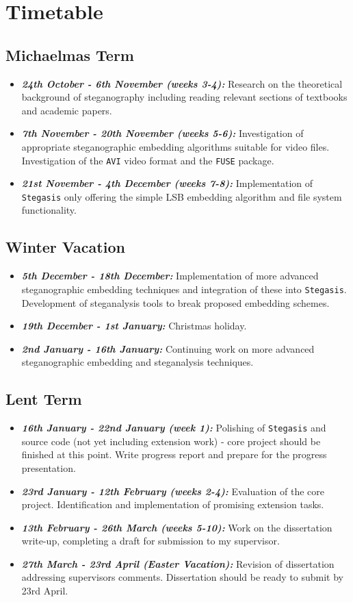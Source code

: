 \documentclass[paper=a4, fontsize=11pt,twoside]{scrartcl}    %
\numberwithin{table}{section}
\numberwithin{figure}{section}
\numberwithin{algorithm}{section}
\begin{document}
\section*{Timetable}
\subsection*{Michaelmas Term}
\begin{itemize}
\item \textbf{\textit{24th October - 6th November (weeks 3-4):}} Research on the theoretical background of steganography including reading relevant sections of textbooks and academic papers.
\item \textbf{\textit{7th November - 20th November (weeks 5-6):}} Investigation of appropriate steganographic embedding algorithms suitable for video files. Investigation of the \texttt{AVI} video format and the \texttt{FUSE} package.
\item \textbf{\textit{21st November - 4th December (weeks 7-8):}} Implementation of \texttt{Stegasis} only offering the simple LSB embedding algorithm and file system functionality.
\end{itemize}

\subsection*{Winter Vacation}
\begin{itemize}
\item \textbf{\textit{5th December - 18th December:}} Implementation of more advanced steganographic embedding techniques and integration of these into \texttt{Stegasis}. Development of steganalysis tools to break proposed embedding schemes.
\item \textbf{\textit{19th December - 1st January:}} Christmas holiday.
\item \textbf{\textit{2nd January - 16th January:}} Continuing work on more advanced steganographic embedding and steganalysis techniques.
\end{itemize}

\subsection*{Lent Term}
\begin{itemize}
\item \textbf{\textit{16th January - 22nd January (week 1):}} Polishing of \texttt{Stegasis} and source code (not yet including extension work) - core project should be finished at this point. Write progress report and prepare for the progress presentation.
\item \textbf{\textit{23rd January - 12th February (weeks 2-4):}} Evaluation of the core project. Identification and implementation of promising extension tasks.
\item \textbf{\textit{13th February - 26th March (weeks 5-10):}} Work on the dissertation write-up, completing a draft for submission to my supervisor.
\item \textbf{\textit{27th March -  23rd April (Easter Vacation):}} Revision of dissertation addressing supervisors comments. Dissertation should be ready to submit by 23rd April.
\end{itemize}
\end{document}
